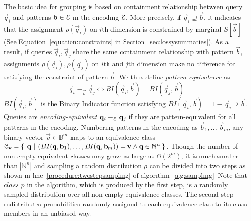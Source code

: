 \begin{appendices}
The basic idea for grouping is based on containment relationship between query $\vec q_i$ and patterns $\mathbf{b}\in \mathcal E$ in the encoding $\mathcal E$. 
More precisely, if $\vec{q}_i\supseteq\vec{b}$, it indicates that the assignment $\rho(\vec{q}_i)$ on $i$th dimension is constrained by marginal $S[\vec{b}]$ (See Equation~\ref{equation:constraints} in Section~\ref{sec:lossysummaries}).
As a result, if queries $\vec{q}_i,\vec{q}_j$ share the same containment relationship with pattern $\vec{b}$, assignments $\rho(\vec{q}_i),\rho(\vec{q}_j)$ on $i$th and $j$th dimension make no difference for satisfying the constraint of pattern $\vec{b}$.
We thus define \textit{pattern-equivalence} as $$\vec{q}_i\equiv_{\vec{b}}\vec{q}_j\Leftrightarrow BI(\vec{q}_i,\vec{b})=BI(\vec{q}_j,\vec{b})$$ 
$BI(\vec{q}_i,\vec{b})$ is the Binary Indicator function satisfying $BI(\vec{q}_i,\vec{b})=1\equiv\vec{q}_i\supseteq\vec{b}$. 
Queries are \textit{encoding-equivalent} $\mathbf{q}_i\equiv_{\mathcal E}\mathbf{q}_j$ if they are pattern-equivalent for all patterns in the encoding. 
Numbering patterns in the encoding as $\vec{b}_1,\ldots,\vec{b}_m$, any binary vector $\vec{v}\in\mathbb{B}^m$ maps to an equivalence class $\mathcal{C}_{\mathbf{v}}=\left\{\left.\;{\mathbf{q}}\;\right|\;{(BI(\mathbf{q},\mathbf{b}_1),\ldots,BI(\mathbf{q},\mathbf{b}_m))=\mathbf{v}\wedge\mathbf{q}\in\mathbb{N}^n}\;\right\}$.
Though the number of non-empty equivalent classes may grow as large as $\mathcal{O}(2^m)$, it is much smaller than $|\mathbb{N}^n|$ and sampling a random distribution $\rho$ can be divided into two steps as shown in line~\ref{procedure:twostepsampling} of algorithm~\ref{alg:sampling}. 
Note that $class\_p$ in the algorithm, which is produced by the first step, is a randomly sampled distribution over all non-empty equivalence classes. The second step redistributes probabilities randomly assigned to each equivalence class to its class members in an unbiased way.


\end{appendices}
